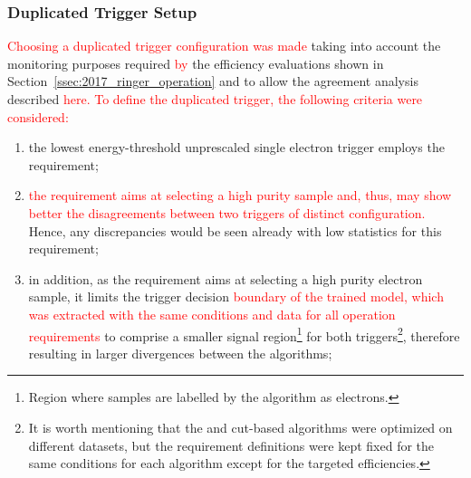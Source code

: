 \subsubsection{Duplicated Trigger Setup}\label{top:duplicated}

\textcolor{red}{Choosing a duplicated trigger configuration was made} 
taking into account the
monitoring purposes required \textcolor{red}{by} the efficiency evaluations shown in
Section~\ref{ssec:2017_ringer_operation} and to allow the agreement analysis described \textcolor{red}{here. To define the duplicated trigger, the following criteria were considered:}


\begin{enumerate}
  \item the lowest energy-threshold unprescaled single electron trigger employs the \tight requirement;%
  \item \textcolor{red}{the \tight requirement aims at selecting a high purity sample and, thus, may show better the disagreements between two triggers of distinct configuration. }Hence, any discrepancies would be seen already with low statistics for this requirement;%
  \item in addition, as the \tight requirement aims at selecting a high purity electron sample, it limits the trigger decision 
  \textcolor{red}{boundary of the trained model, which was extracted with the same conditions and data for all operation requirements} 
  to comprise a smaller signal region\footnote{Region where samples are labelled by the algorithm as electrons.} for both triggers\footnote{It is worth mentioning that the \rnn{} and cut-based algorithms were optimized on different datasets, but the requirement definitions were kept fixed for the same conditions for each algorithm except for the targeted efficiencies.}, therefore resulting in larger divergences between the algorithms;
  

\end{enumerate}
